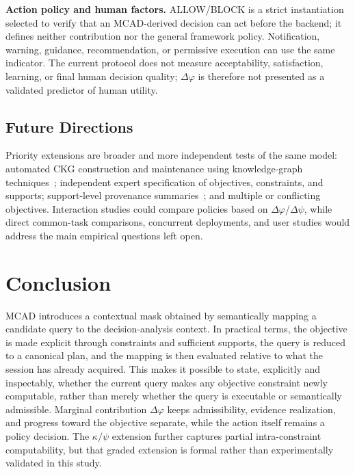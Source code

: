 \documentclass[journal]{IEEEtran}
\begin{document}
\textbf{Action policy and human factors.} ALLOW/BLOCK is a strict instantiation selected to verify that an MCAD-derived decision can act before the backend; it defines neither contribution nor the general framework policy. Notification, warning, guidance, recommendation, or permissive execution can use the same indicator. The current protocol does not measure acceptability, satisfaction, learning, or final human decision quality; $\Delta\varphi$ is therefore not presented as a validated predictor of human utility.

\subsection{Future Directions}

Priority extensions are broader and more independent tests of the same model: automated CKG construction and maintenance using knowledge-graph techniques~\cite{ZhongKGC2024}; independent expert specification of objectives, constraints, and supports; support-level provenance summaries~\cite{AlOmeirLaiMilaniPottinger2023}; and multiple or conflicting objectives. Interaction studies could compare policies based on $\Delta\varphi$/$\Delta\psi$, while direct common-task comparisons, concurrent deployments, and user studies would address the main empirical questions left open.

\begingroup
\raggedbottom
\setlength{\parskip}{0pt}
\section{Conclusion}
\label{sec:conclusion}

MCAD introduces a contextual mask obtained by semantically mapping a candidate query to the decision-analysis context. In practical terms, the objective is made explicit through constraints and sufficient supports, the query is reduced to a canonical plan, and the mapping is then evaluated relative to what the session has already acquired. This makes it possible to state, explicitly and inspectably, whether the current query makes any objective constraint newly computable, rather than merely whether the query is executable or semantically admissible. Marginal contribution $\Delta\varphi$ keeps admissibility, evidence realization, and progress toward the objective separate, while the action itself remains a policy decision. The $\kappa/\psi$ extension further captures partial intra-constraint computability, but that graded extension is formal rather than experimentally validated in this study.
\end{document}
